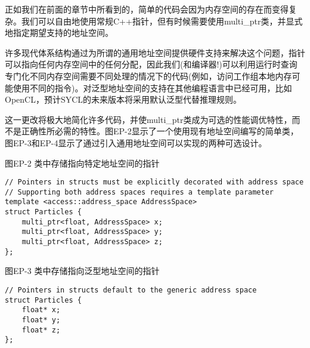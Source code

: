 正如我们在前面的章节中所看到的，简单的代码会因为内存空间的存在而变得复杂。我们可以自由地使用常规C++指针，但有时候需要使用multi\_ptr类，并显式地指定期望支持的地址空间。\par

许多现代体系结构通过为所谓的通用地址空间提供硬件支持来解决这个问题，指针可以指向任何内存空间中的任何分配，因此我们(和编译器!)可以利用运行时查询专门化不同内存空间需要不同处理的情况下的代码(例如，访问工作组本地内存可能使用不同的指令)。对泛型地址空间的支持在其他编程语言中已经可用，比如OpenCL，预计SYCL的未来版本将采用默认泛型代替推理规则。\par

这一更改将极大地简化许多代码，并使multi\_ptr类成为可选的性能调优特性，而不是正确性所必需的特性。图EP-2显示了一个使用现有地址空间编写的简单类，图EP-3和EP-4显示了通过引入通用地址空间可以实现的两种可选设计。\par

\hspace*{\fill} \par %
图EP-2 类中存储指向特定地址空间的指针
\begin{lstlisting}[caption={}]
// Pointers in structs must be explicitly decorated with address space
// Supporting both address spaces requires a template parameter
template <access::address_space AddressSpace>
struct Particles {
	multi_ptr<float, AddressSpace> x;
	multi_ptr<float, AddressSpace> y;
	multi_ptr<float, AddressSpace> z;
};
\end{lstlisting}

\hspace*{\fill} \par %
图EP-3 类中存储指向泛型地址空间的指针
\begin{lstlisting}[caption={}]
// Pointers in structs default to the generic address space
struct Particles {
	float* x;
	float* y;
	float* z;
};
\end{lstlisting}

